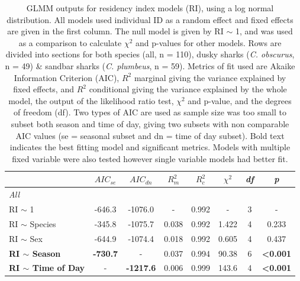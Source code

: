 \documentclass[11pt,a4paper]{article}
\begin{document}
	
	\begin{table}[h!]
		\caption{GLMM outputs for residency index models (RI), using a log normal distribution. All models used individual ID as a random effect and fixed effects are given in the first column. The null model is given by RI $\sim$ 1, and was used as a comparison to calculate $\chi^2$ and p-values for other models. Rows are divided into sections for both species (all, n = 110), dusky sharks (\textit{C. obscurus}, n = 49) \& sandbar sharks (\textit{C. plumbeus}, n = 59). Metrics of fit used are Akaike Information Criterion (AIC), $R^2$ marginal giving the variance explained by fixed effects, and $R^2$ conditional giving the variance explained by the whole model, the output of the likelihood ratio test, $\chi^2$ and p-value, and the degrees of freedom (df). Two types of AIC are used as sample size was too small to subset both season and time of day, giving two subsets with non comparable AIC values (se = seasonal subset and dn = time of day subset). Bold text indicates the best fitting model and significant metrics. Models with multiple fixed variable were also tested however single variable models had better fit.}
		\centering
		\begin{tabular}{lccccccc}
			& $AIC_{se}$ & $AIC_{dn}$ & $R^2_m$ & $R^2_c$ & $\chi^2$ & \textit{df} & \textit{p}      \\ \hline
			\textit{All}                   &             &             &                         &                         &                        &             &                 \\
			RI $\sim$ 1                     & -646.3      & -1076.0     & -                       & 0.992                   & -                      & 3           & -               \\
			RI $\sim$ Species               & -345.8      & -1075.7     & 0.038                   & 0.992                   & 1.422                  & 4           & 0.233           \\
			RI $\sim$ Sex                   & -644.9      & -1074.4     & 0.018                   & 0.992                   & 0.605                  & 4           & 0.437           \\
			\textbf{RI $\sim$ Season     }           & \textbf{-730.7}      & -           & 0.037                   & 0.994                   & 90.38                  & 6           & \textbf{\textless 0.001 }\\
			\textbf{RI $\sim$ Time of Day}           & -           & \textbf{-1217.6}     & 0.006                   & 0.999                   & 143.6                  & 4           & \textbf{\textless 0.001} \\

\end{tabular}
\end{table}
\end{document}
